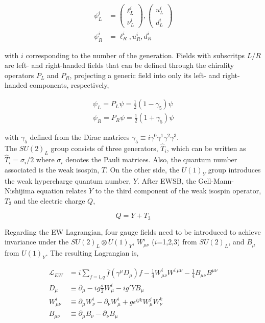\begin{equation}
\begin{split}
    \psi_L^i &= \begin{pmatrix}\ell^i_L\\ \nu^i_L \end{pmatrix}, \begin{pmatrix} u^i_L \\ d^i_L \end{pmatrix}\\
    \psi_R^i &= \ell^i_R, u^i_R, d^i_R
\end{split}
\end{equation}

with $i$ corresponding to the number of the generation. Fields with subscritps $L/R$ are left- and right-handed fields that can be defined through the chirality operators $P_L$ and $P_R$, projecting a generic field into only its left- and right-handed components, respectively,

\begin{equation}
    \begin{split}
        \psi_L = P_L\psi = \frac{1}{2}(1-\gamma_5)\psi\\
        \psi_R = P_R\psi = \frac{1}{2}(1+\gamma_5)\psi
    \end{split}
\end{equation}

with $\gamma_5$ defined from the Dirac matrices $\gamma_5\equiv i\gamma^0\gamma^1\gamma^2\gamma^3$.\\

The $SU(2)_L$ group consists of three generators, $\hat{T}_i$, which can be written as $\hat{T}_i=\sigma_i/2$ where $\sigma_i$ denotes the Pauli matrices. Also, the quantum number associated is the weak isospin, $T$.
On the other side, the $U(1)_Y$ group introduces the weak hypercharge quantum number, $Y$. After EWSB, the Gell-Mann-Nishijima equation relates $Y$ to the third component of the weak isospin operator, $T_3$ and the electric charge $Q$,

\begin{equation}
Q = Y+T_3
\end{equation}

Regarding the EW Lagrangian, four gauge fields need to be introduced to achieve invariance under the $SU(2)_L\otimes U(1)_Y$, $W_{\mu\nu}^i$ ($i$=1,2,3) from $SU(2)_L$, and $B_\mu$ from $U(1)_Y$. The resulting Lagrangian is,

\begin{equation}
\label{Theory_eq:EWlagrangian}
\begin{split}
    \mathcal{L}_{EW}&=i\sum_{f=l,q}\bar{f}(\gamma^\mu D_\mu)f - \frac{1}{4}W_{\mu\nu}^iW^{i\ \mu\nu} - \frac{1}{4}B_{\mu\nu}B^{\mu\nu}\\
    D_{\mu \ } &\equiv \partial_\mu - ig\frac{\sigma}{2}W_\mu^i-ig'YB_\mu \\
    W_{\mu\nu}^i &\equiv \partial_\mu W_\nu^i - \partial_\nu W_\mu^i +g\epsilon^{ijk}W_\mu^j W_\nu^k\\
    B_{\mu\nu}&\equiv\partial_\mu B_\nu - \partial_\nu B_\mu
    \end{split}
\end{equation}

